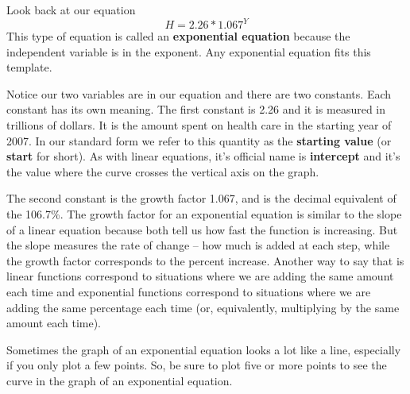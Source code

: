 Look back at our equation $$H = 2.26\ast 1.067^{Y}$$
This type of equation is called an \textbf{exponential equation} because the independent variable is in the exponent.  
Any exponential equation fits this template.

\bigskip
\bigskip

Notice our two variables are in our equation and there are two constants. Each constant has its own meaning.  The first constant is 2.26 and it is measured in trillions of dollars.  It is the amount spent on health care in the starting year of 2007.  In our standard form we refer to this quantity as the \textbf{starting value} (or \textbf{start} for short).  As with linear equations, it's official name is \textbf{intercept} and it's the value where the curve crosses the vertical axis on the graph.

The second constant is the growth factor 1.067, and is the decimal equivalent of the 106.7\%.  The growth factor for an exponential equation is similar to the slope of a linear equation because both tell us how fast the function is increasing.  But the slope measures the rate of change -- how much is added at each step, while the growth factor corresponds to the percent increase.  Another way to say that is linear functions correspond to situations where we are adding the same amount each time and exponential functions correspond to situations where we are adding the same percentage each time (or, equivalently, multiplying by the same amount each time).

Sometimes the graph of an exponential equation looks a lot like a  line, especially if you only plot a few points.  So, be sure to plot five or more points to see the curve in the graph of an exponential equation. 








%